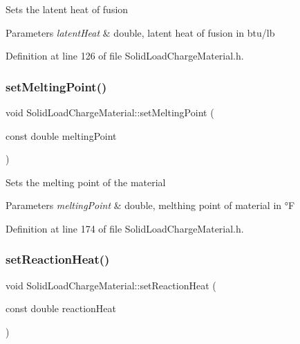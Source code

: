 Sets the latent heat of fusion 
\begin{DoxyParams}{Parameters}
{\em latent\+Heat} & double, latent heat of fusion in btu/lb \\
\hline
\end{DoxyParams}


Definition at line 126 of file Solid\+Load\+Charge\+Material.\+h.

\mbox{\label{class_solid_load_charge_material_a6c235b1c49be98b02829d37af9c38cb2}} 
\subsubsection{\texorpdfstring{set\+Melting\+Point()}{setMeltingPoint()}}
{\footnotesize\ttfamily void Solid\+Load\+Charge\+Material\+::set\+Melting\+Point (\begin{DoxyParamCaption}\item[{const double}]{melting\+Point }\end{DoxyParamCaption})\hspace{0.3cm}{\ttfamily [inline]}}

Sets the melting point of the material 
\begin{DoxyParams}{Parameters}
{\em melting\+Point} & double, melthing point of material in °F \\
\hline
\end{DoxyParams}


Definition at line 174 of file Solid\+Load\+Charge\+Material.\+h.

\mbox{\label{class_solid_load_charge_material_a9c3cd28b2b31fb66eea984d9030cd247}} 
\subsubsection{\texorpdfstring{set\+Reaction\+Heat()}{setReactionHeat()}}
{\footnotesize\ttfamily void Solid\+Load\+Charge\+Material\+::set\+Reaction\+Heat (\begin{DoxyParamCaption}\item[{const double}]{reaction\+Heat }\end{DoxyParamCaption})\hspace{0.3cm}{\ttfamily [inline]}}

